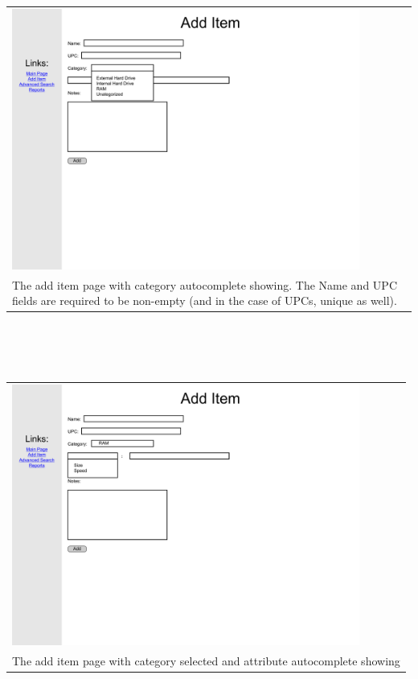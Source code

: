 \documentclass{article}
\begin{document}
~\\
~\\
\begin{tabular}{ p{4.5in} }
\includegraphics[keepaspectratio, width=4.5in]{addItemF0S1.pdf}\\
The add item page with category autocomplete showing.  The Name and UPC fields are required to be non-empty (and in the case of UPCs, unique as well).
\end{tabular}\\
~\\
~\\
\begin{tabular}{ p{4.5in} }
\includegraphics[keepaspectratio, width=4.5in]{addItemF0S2.pdf}  \\
The add item page with category selected and attribute autocomplete showing
\end{tabular}\\
~\\
\end{document}
